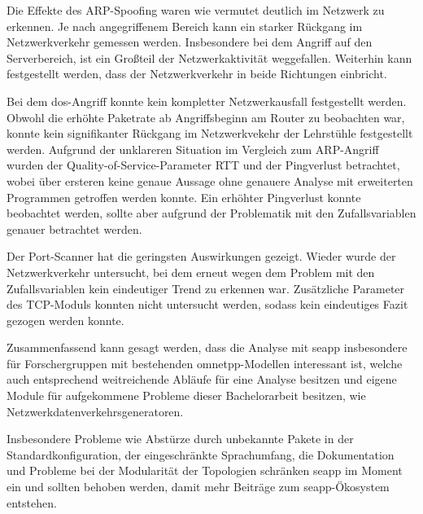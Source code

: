 Die Effekte des ARP-Spoofing waren wie vermutet deutlich im Netzwerk zu erkennen. Je nach angegriffenem Bereich kann ein starker Rückgang im Netzwerkverkehr gemessen werden. Insbesondere bei dem Angriff auf den Serverbereich, ist ein Großteil der Netzwerkaktivität weggefallen. Weiterhin kann festgestellt werden, dass der Netzwerkverkehr in beide Richtungen einbricht.

Bei dem \gls{dos}-Angriff konnte kein kompletter Netzwerkausfall festgestellt werden. Obwohl die erhöhte Paketrate ab Angriffsbeginn am Router zu beobachten war, konnte kein signifikanter Rückgang im Netzwerkvekehr der Lehrstühle festgestellt werden. Aufgrund der unklareren Situation im Vergleich zum ARP-Angriff wurden der Quality-of-Service-Parameter RTT und der Pingverlust betrachtet, wobei über ersteren keine genaue Aussage ohne genauere Analyse mit erweiterten Programmen getroffen werden konnte. Ein erhöhter Pingverlust konnte beobachtet werden, sollte aber aufgrund der Problematik mit den Zufallsvariablen genauer betrachtet werden.

Der Port-Scanner hat die geringsten Auswirkungen gezeigt. Wieder wurde der Netzwerkverkehr untersucht, bei dem erneut wegen dem Problem mit den Zufallsvariablen kein eindeutiger Trend zu erkennen war. Zusätzliche Parameter des TCP-Moduls konnten nicht untersucht werden, sodass kein eindeutiges Fazit gezogen werden konnte.

Zusammenfassend kann gesagt werden, dass die Analyse mit \gls{seapp} insbesondere für Forschergruppen mit bestehenden \gls{omnetpp}-Modellen interessant ist, welche auch entsprechend weitreichende Abläufe für eine Analyse besitzen und eigene Module für aufgekommene Probleme dieser Bachelorarbeit besitzen, wie \zB Netzwerkdatenverkehrsgeneratoren. 

Insbesondere Probleme wie Abstürze durch unbekannte Pakete in der Standardkonfiguration, der eingeschränkte Sprachumfang, die Dokumentation und Probleme bei der Modularität der Topologien schränken \gls{seapp} im Moment ein und sollten behoben werden, damit mehr Beiträge zum \gls{seapp}-Ökosystem entstehen. 